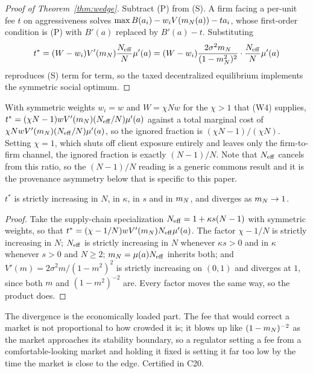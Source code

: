 \begin{proof}[Proof of Theorem~\ref{thm:wedge}]
Subtract (P) from (S). A firm facing a per-unit fee $t$ on aggressiveness solves $\max B(a_i) - w_iV(m_N(a)) - ta_i$, whose first-order condition is (P) with $B'(a)$ replaced by $B'(a)-t$. Substituting
\[
  t^\ast = (W - w_i)V'(m_N)\frac{N_{\mathrm{eff}}}{N}\mu'(a) = (W-w_i)\frac{2\sigma^2m_N}{(1-m_N^2)^2}\cdot\frac{N_{\mathrm{eff}}}{N}\mu'(a)
\]
reproduces (S) term for term, so the taxed decentralized equilibrium implements the symmetric social optimum.
\end{proof}

With symmetric weights $w_i = w$ and $W = \chi Nw$ for the $\chi > 1$ that (W4) supplies, $t^\ast = (\chi N - 1)wV'(m_N)(N_{\mathrm{eff}}/N)\mu'(a)$ against a total marginal cost of $\chi NwV'(m_N)(N_{\mathrm{eff}}/N)\mu'(a)$, so the ignored fraction is $(\chi N-1)/(\chi N)$. Setting $\chi = 1$, which shuts off client exposure entirely and leaves only the firm-to-firm channel, the ignored fraction is exactly $(N-1)/N$. Note that $N_{\mathrm{eff}}$ cancels from this ratio, so the $(N-1)/N$ reading is a generic commons result and it is the provenance asymmetry below that is specific to this paper.

\begin{aproposition}
\label{aprop:cstat}
$t^\ast$ is strictly increasing in $N$, in $\kappa$, in $s$ and in $m_N$, and diverges as $m_N \to 1$.
\end{aproposition}

\begin{proof}
Take the supply-chain specialization $N_{\mathrm{eff}} = 1+\kappa s(N-1)$ with symmetric weights, so that $t^\ast = (\chi - 1/N)wV'(m_N)N_{\mathrm{eff}}\mu'(a)$. The factor $\chi - 1/N$ is strictly increasing in $N$; $N_{\mathrm{eff}}$ is strictly increasing in $N$ whenever $\kappa s > 0$ and in $\kappa$ whenever $s>0$ and $N \geq 2$; $m_N = \mu(a)N_{\mathrm{eff}}$ inherits both; and $V'(m) = 2\sigma^2m/(1-m^2)^2$ is strictly increasing on $(0,1)$ and diverges at $1$, since both $m$ and $(1-m^2)^{-2}$ are. Every factor moves the same way, so the product does.
\end{proof}

The divergence is the economically loaded part. The fee that would correct a market is not proportional to how crowded it is; it blows up like $(1-m_N)^{-2}$ as the market approaches its stability boundary, so a regulator setting a fee from a comfortable-looking market and holding it fixed is setting it far too low by the time the market is close to the edge. Certified in C20.

